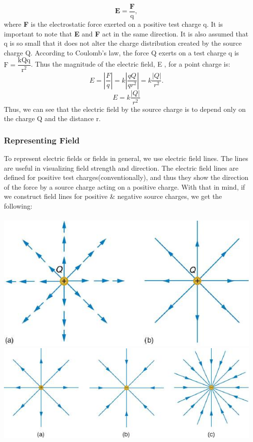 \documentclass[9pt]{article}
\begin{document}
	$$\mathbf{E}=\dfrac{\mathbf{F}}{\text{q}},$$ where  \textbf{F}  is the electrostatic force exerted on a positive test charge q.  It is important to note that  \textbf{E}  and \textbf{F} act in the same direction. It is also assumed that q is so small that it does not alter the charge distribution created by the source charge Q. According to Coulomb’s law, the force Q exerts on a test charge q is $\text{F}=\dfrac{\text{kQq}}{\text{r}^2}$. Thus the magnitude of the electric field, E , for a point charge is: 
	$$E=|\dfrac{F}{q}|=k|\dfrac{qQ}{qr^{2}}|=k\dfrac{|Q|}{r^{2}}.$$
	$$E=k\dfrac{|Q|}{r^{2}}$$
	Thus, we can see that the electric field by the source charge is to depend only on the charge Q and the distance r.
	\subsubsection*{Representing Field}
	To represent electric fields or fields in general, we use electric field lines. The lines are useful in visualizing field strength and direction. The electric field lines are defined for positive test charges(conventionally), and thus they show the direction of the force by a source charge acting on a positive charge. With that in mind, if we construct field lines for positive \& negative source charges, we get the following: \\ \\
	\includegraphics[scale=0.3]{source_p}\hspace{1in}\includegraphics[scale=0.4]{source_n} \\
\end{document}

